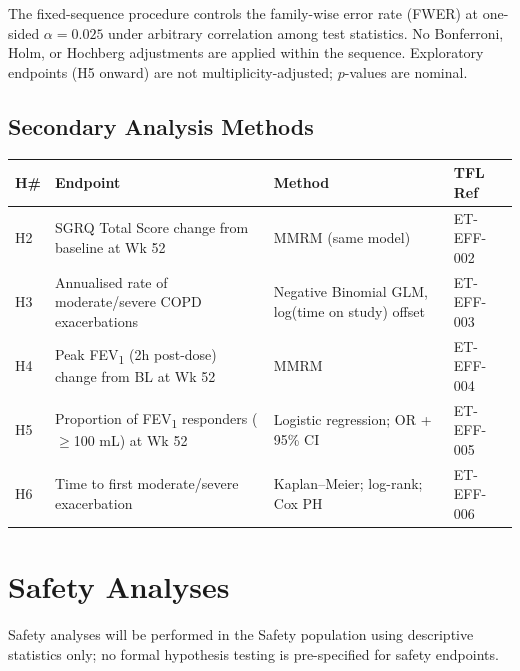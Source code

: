 \documentclass[11pt,a4paper]{article}
\begin{document}
\begin{tcolorbox}[sapnote, title={\faIcon{shield-alt}\ Family-Wise Error Rate Control}]
  The fixed-sequence procedure controls the family-wise error rate (FWER) at one-sided
  $\alpha = 0.025$ under arbitrary correlation among test statistics. No Bonferroni,
  Holm, or Hochberg adjustments are applied within the sequence.
  Exploratory endpoints (H5 onward) are not multiplicity-adjusted; $p$-values are nominal.
\end{tcolorbox}

\subsection{Secondary Analysis Methods}

\begin{tabularx}{\linewidth}{@{}
  >{\centering\arraybackslash}p{8mm}
  >{\raggedright\arraybackslash}X
  >{\raggedright\arraybackslash}p{38mm}
  >{\centering\arraybackslash}p{16mm}@{}}
\toprule
\rowcolor{sapfog}
\textbf{H\#} & \textbf{Endpoint} & \textbf{Method} & \textbf{TFL Ref} \\
\midrule
H2 & SGRQ Total Score change from baseline at Wk 52 & MMRM (same model) & ET-EFF-002 \\
\addlinespace[2pt]
H3 & Annualised rate of moderate/severe COPD exacerbations & Negative Binomial GLM, log(time on study) offset & ET-EFF-003 \\
\addlinespace[2pt]
H4 & Peak FEV\textsubscript{1} (2h post-dose) change from BL at Wk 52 & MMRM & ET-EFF-004 \\
\addlinespace[2pt]
H5 & Proportion of FEV\textsubscript{1} responders ($\geq$100 mL) at Wk 52 & Logistic regression; OR + 95\% CI & ET-EFF-005 \\
\addlinespace[2pt]
H6 & Time to first moderate/severe exacerbation & Kaplan--Meier; log-rank; Cox PH & ET-EFF-006 \\
\bottomrule
\end{tabularx}

\clearpage

\section{Safety Analyses}

Safety analyses will be performed in the Safety population using descriptive statistics
only; no formal hypothesis testing is pre-specified for safety endpoints.
\end{document}
